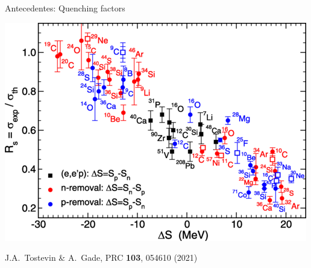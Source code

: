 \documentclass{beamer}
\begin{document}
\begin{frame}{Antecedentes: Quenching factors} 
    \begin{minipage}{0.45\textwidth}
    \begin{center}
    \includegraphics[height=0.4\textheight]{Tostevin.png}
    
    \tiny J.A.~Tostevin \& A.~Gade, PRC \textbf{103}, 054610 (2021)
   

\end{center}
\end{minipage}
\end{frame}
\end{document}
